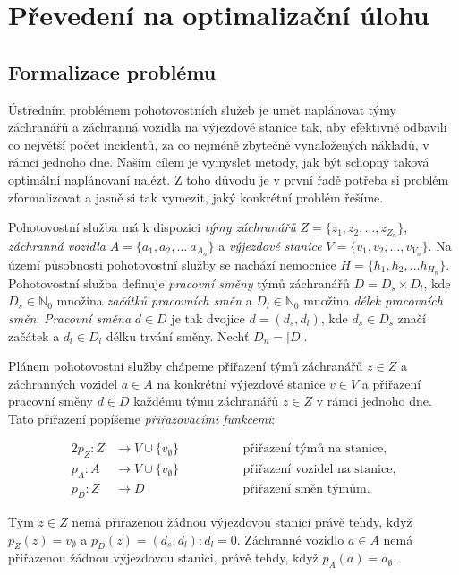 \chapter{Převedení na optimalizační úlohu}

\section{Formalizace problému}\label{kap:formalizaceProblemu}

Ústředním problémem pohotovostních služeb je umět naplánovat týmy záchranářů a záchranná vozidla na výjezdové stanice tak, aby efektivně odbavili co největší počet incidentů,
za co nejméně zbytečně vynaložených nákladů, v rámci jednoho dne.
Naším cílem je vymyslet metody, jak být schopný taková optimální naplánovaní nalézt.
Z toho důvodu je v první řadě potřeba si problém zformalizovat a jasně si tak vymezit, jaký konkrétní problém řešíme.

Pohotovostní služba má k dispozici \textit{týmy záchranářů} $Z = \{ z_1, z_2, \dots, z_{Z_n} \}$, \textit{záchranná vozidla} $A = \{ a_1, a_2, \dots\ a_{A_n} \}$
a \textit{výjezdové stanice} $V = \{ v_1, v_2, \dots, v_{V_n} \}$. 
Na území působnosti pohotovostní služby se nachází nemocnice $H = \{ h_1, h_2, \dots h_{H_n} \}$.
Pohotovostní služba definuje \textit{pracovní směny} týmů záchranářů $D = D_{s} \times D_{l}$, 
kde $D_{s} \in \mathbb{N}_0$ množina \textit{začátků pracovních směn} a $D_{l} \in \mathbb{N}_0$ množina \textit{délek pracovních směn}.
\textit{Pracovní směna} $d \in D$ je tak dvojice $d = (d_s, d_l)$, kde $d_{s} \in D_{s}$ značí začátek a $d_{l} \in D_{l}$ délku trvání směny.
Nechť $D_n = |D|$.

Plánem pohotovostní služby chápeme přiřazení týmů záchranářů $z \in Z$ a záchranných vozidel $a \in A$ na konkrétní výjezdové stanice $v \in V$
a přiřazení pracovní směny $d \in D$ každému týmu záchranářů $z \in Z$ v rámci jednoho dne.
Tato přiřazení popíšeme \textit{přiřazovacími funkcemi}:
\begin{definice}
  \begin{alignat*}{2}
    p_Z \colon Z &\rightarrow V \cup \{ v_{\emptyset} \} \quad && \hspace{30pt} \text{přiřazení týmů na stanice}, \\
    p_A \colon A &\rightarrow V \cup \{ v_{\emptyset} \} \quad && \hspace{30pt} \text{přiřazení vozidel na stanice}, \\ 
    p_{D} \colon Z &\rightarrow D                        \quad && \hspace{30pt} \text{přiřazení směn týmům}.
  \end{alignat*}
\end{definice}
Tým $z \in Z$ nemá přiřazenou žádnou výjezdovou stanici právě tehdy, když
$p_{Z}(z) = v_{\emptyset}$ a $p_{D}(z) = (d_s, d_l) \colon d_l = 0$.
Záchranné vozidlo $a \in A$ nemá přiřazenou žádnou výjezdovou stanici, právě tehdy, když $p_{A}(a) = a_{\emptyset}$.

